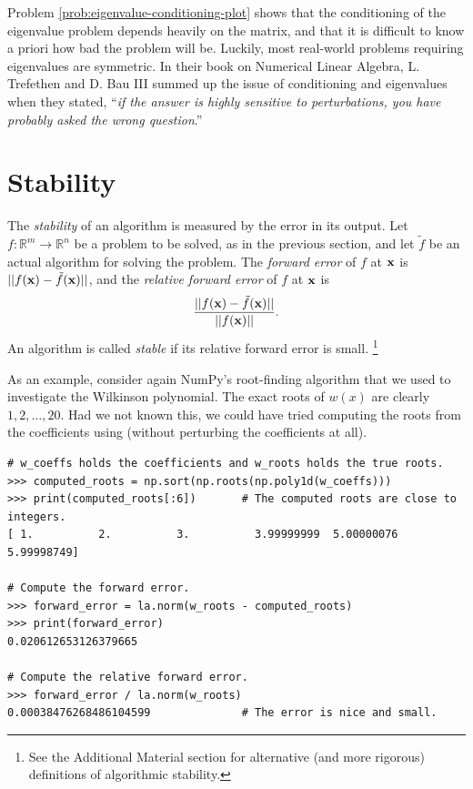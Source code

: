 Problem \ref{prob:eigenvalue-conditioning-plot} shows that the conditioning of the eigenvalue problem depends heavily on the matrix, and that it is difficult to know a priori how bad the problem will be.
Luckily, most real-world problems requiring eigenvalues are symmetric.
In their book on Numerical Linear Algebra, L. Trefethen and D. Bau III summed up the issue of conditioning and eigenvalues when they stated, ``\emph{if the answer is highly sensitive to perturbations, you have probably asked the wrong question}.''

\section*{Stability} %

The \emph{stability} of an algorithm is measured by the error in its output.
Let $f: \mathbb{R}^m \rightarrow \mathbb{R}^n$ be a problem to be solved, as in the previous section, and let $\tilde{f}$ be an actual algorithm for solving the problem.
The \emph{forward error} of $f$ at $\mathbf{x}$ is $||f(\mathbf{x})-\tilde f(\mathbf{x})||$, and the \emph{relative forward error} of $f$ at $\mathbf{x}$ is
\[
\frac{||f(\mathbf{x})-\tilde f(\mathbf{x})||}{||f(\mathbf{x})||}.
\]
An algorithm is called \emph{stable} if its relative forward error is small.%
\footnote{See the Additional Material section for alternative (and more rigorous) definitions of algorithmic stability.}

As an example, consider again NumPy's root-finding algorithm that we used to investigate the Wilkinson polynomial.
The exact roots of $w(x)$ are clearly $1,2,\ldots,20$.
Had we not known this, we could have tried computing the roots from the coefficients using  (without perturbing the coefficients at all).

\begin{lstlisting}
# w_coeffs holds the coefficients and w_roots holds the true roots.
>>> computed_roots = np.sort(np.roots(np.poly1d(w_coeffs)))
>>> print(computed_roots[:6])       # The computed roots are close to integers.
[ 1.          2.          3.          3.99999999  5.00000076  5.99998749]

# Compute the forward error.
>>> forward_error = la.norm(w_roots - computed_roots)
>>> print(forward_error)
0.020612653126379665

# Compute the relative forward error.
>>> forward_error / la.norm(w_roots)
0.00038476268486104599              # The error is nice and small.
\end{lstlisting}

